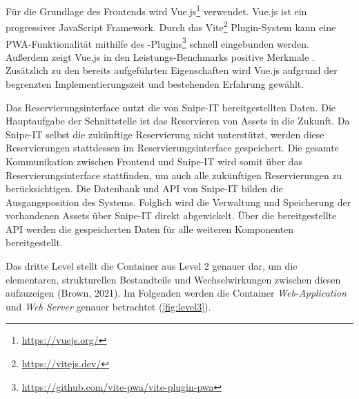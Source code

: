 Für die Grundlage des Frontends wird Vue.js\footnote{\url{https://vuejs.org/}}
verwendet. Vue.js ist ein progressiver JavaScript Framework. Durch das
Vite\footnote{\url{https://vitejs.dev/}} Plugin-System kann eine
PWA-Funktionalität mithilfe des
-Plugins\footnote{\url{https://github.com/vite-pwa/vite-plugin-pwa}}
schnell eingebunden werden. Außerdem zeigt Vue.js in den Leistungs-Benchmarks
positive Merkmale . Zusätzlich zu den bereits
aufgeführten Eigenschaften wird Vue.js aufgrund der begrenzten
Implementierungszeit und bestehenden Erfahrung gewählt.

Das Reservierungsinterface nutzt die von Snipe-IT bereitgestellten Daten. Die
Hauptaufgabe der Schnittstelle ist das Reservieren von Assets in die Zukunft. Da
Snipe-IT selbst die zukünftige Reservierung nicht unterstützt, werden diese
Reservierungen stattdessen im Reservierungsinterface gespeichert. Die gesamte
Kommunikation zwischen Frontend und Snipe-IT wird somit über das
Reservierungsinterface stattfinden, um auch alle zukünftigen Reservierungen zu
berücksichtigen. Die Datenbank und API von Snipe-IT bilden die Ausgangsposition
des Systems. Folglich wird die Verwaltung und Speicherung der vorhandenen Assets
über Snipe-IT direkt abgewickelt. Über die bereitgestellte API werden die
gespeicherten Daten für alle weiteren Komponenten bereitgestellt.

    {\sffamily\color{maincolor}{Level 3: Components}}

Das dritte Level stellt die Container aus Level 2 genauer dar, um die
elementaren, strukturellen Bestandteile und Wechselwirkungen zwischen diesen
aufzuzeigen (Brown, 2021). Im Folgenden werden die Container
\textit{Web-Application} und \textit{Web Server} genauer betrachtet
(\ref{fig:level3}).

